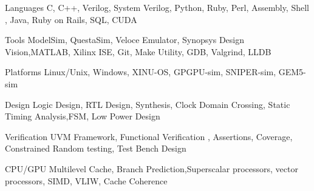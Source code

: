 

\begin{cvskills}

  \cvskill
    {Languages} %
    {C, C++, Verilog, System Verilog, Python, Ruby, Perl, Assembly, Shell , Java, Ruby on Rails, SQL, CUDA} %

  \cvskill
    {Tools} %
    {ModelSim, QuestaSim, Veloce Emulator, Synopsys Design Vision,MATLAB, Xilinx ISE, Git, Make Utility, GDB, Valgrind, LLDB} %

    \cvskill
    {Platforms} %
    {Linux/Unix, Windows, XINU-OS, GPGPU-sim, SNIPER-sim, GEM5-sim} %

  \cvskill
    {Design} %
    { Logic Design, RTL Design, Synthesis, Clock Domain Crossing, Static Timing Analysis,FSM, Low Power Design} %

  \cvskill
    {Verification} %
    {UVM Framework, Functional Verification , Assertions, Coverage, Constrained Random testing, Test Bench Design} %

  \cvskill
    {CPU/GPU} %
    {Multilevel Cache, Branch Prediction,Superscalar processors, vector processors, SIMD, VLIW, Cache Coherence} %

  

\end{cvskills}
